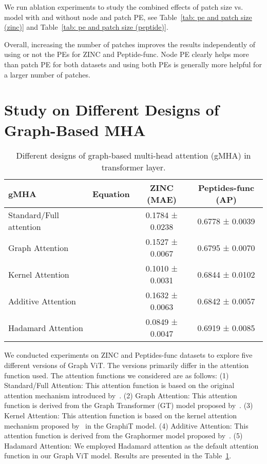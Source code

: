 \documentclass{article}
\begin{document}
We run ablation experiments to study the combined effects of patch size vs. model with and without node and patch PE, see Table~\ref{tab: pe and patch size (zinc)} and Table~\ref{tab: pe and patch size (peptide)}.


Overall, increasing the number of patches improves the results independently of using or not the PEs for ZINC and Peptide-func. Node PE clearly helps more than patch PE for both datasets and using both PEs is generally more helpful for a larger number of patches.


\section{Study on Different Designs of Graph-Based MHA}\label{section: design of MHA}

\begin{table}[!ht]
    \centering
\caption{Different designs of graph-based multi-head attention (gMHA) in transformer layer.}
    \label{tab: graph vit}
    \small
    \begin{tabular}{llcc}
    \toprule
         gMHA &  Equation & ZINC (MAE)& Peptides-func (AP) \\
         \midrule
         Standard/Full attention~\citep{vaswani2017attention}
         & 
         & 0.1784 ± 0.0238
         & 0.6778 ± 0.0039 \\
        Graph Attention~\citep{dwivedi2021generalization}
        & 
        & 0.1527 ± 0.0067
        & 0.6795 ± 0.0070  \\
        Kernel Attention~\citep{mialon2021graphit}
        & 
        & 0.1010 ± 0.0031
        & 0.6844 ± 0.0102 \\
        Additive Attention~\citep{ying2021graphormer}
        & 
        & 0.1632 ± 0.0063
        & 0.6842 ± 0.0057\\
        Hadamard Attention
        &  
        & 0.0849 ± 0.0047
        & 0.6919 ± 0.0085 \\
        \bottomrule
    \end{tabular}
\end{table}

We conducted experiments on ZINC and Peptides-func datasets to explore five different versions of Graph ViT. The versions primarily differ in the attention function used. The attention functions we considered are as follows:
(1) Standard/Full Attention: This attention function is based on the original attention mechanism introduced by~\citet{vaswani2017attention}.
(2) Graph Attention: This attention function is derived from the Graph Transformer (GT) model proposed by~\citet{dwivedi2021generalization}.
(3) Kernel Attention: This attention function is based on the kernel attention mechanism proposed by~\citet{mialon2021graphit} in the GraphiT model.
(4) Additive Attention: This attention function is derived from the Graphormer model proposed by~\citet{ying2021graphormer}.
(5) Hadamard Attention: We employed Hadamard attention as the default attention function in our Graph ViT model. 
Results are presented in the Table~\ref{tab: graph vit}. 
\end{document}
